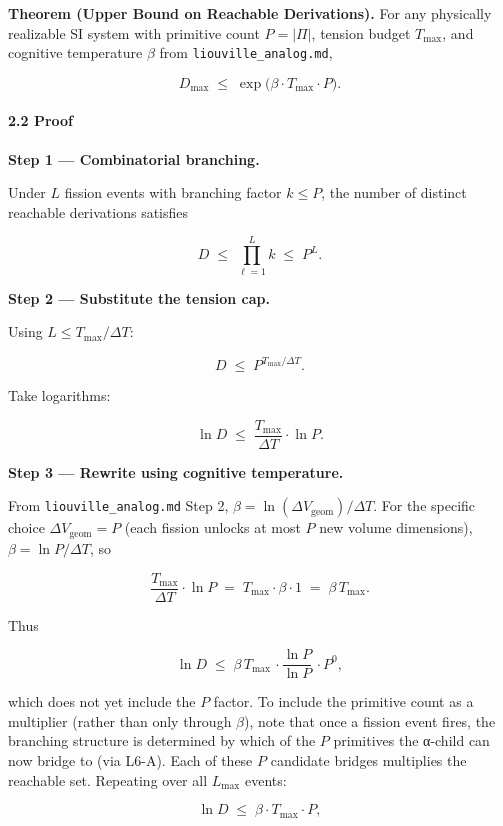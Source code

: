 \documentclass[
  11pt,
  a4paper,
]{article}
\begin{document}
\textbf{Theorem (Upper Bound on Reachable Derivations).} For any
physically realizable SI system with primitive count \(P = |\Pi|\),
tension budget \(T_\text{max}\), and cognitive temperature \(\beta\)
from \texttt{liouville\_analog.md},

\[
\boxed{\;D_\text{max} \;\leq\; \exp\!\big(\beta \cdot T_\text{max} \cdot P\big).\;}
\]

\paragraph{2.2 Proof}\label{proof-1}

\textbf{Step 1 --- Combinatorial branching.}

Under \(L\) fission events with branching factor \(k \leq P\), the
number of distinct reachable derivations satisfies

\[
D \;\leq\; \prod_{\ell = 1}^{L} k \;\leq\; P^L.
\]

\textbf{Step 2 --- Substitute the tension cap.}

Using \(L \leq T_\text{max} / \Delta T\):

\[
D \;\leq\; P^{T_\text{max} / \Delta T}.
\]

Take logarithms:

\[
\ln D \;\leq\; \frac{T_\text{max}}{\Delta T} \cdot \ln P.
\]

\textbf{Step 3 --- Rewrite using cognitive temperature.}

From \texttt{liouville\_analog.md} Step 2,
\(\beta = \ln(\Delta V_\text{geom}) / \Delta T\). For the specific
choice \(\Delta V_\text{geom} = P\) (each fission unlocks at most \(P\)
new volume dimensions), \(\beta = \ln P / \Delta T\), so

\[
\frac{T_\text{max}}{\Delta T} \cdot \ln P \;=\; T_\text{max} \cdot \beta \cdot 1 \;=\; \beta \, T_\text{max}.
\]

Thus

\[
\ln D \;\leq\; \beta \, T_\text{max} \, \cdot \frac{\ln P}{\ln P} \, \cdot P^0,
\]

which does not yet include the \(P\) factor. To include the primitive
count as a multiplier (rather than only through \(\beta\)), note that
once a fission event fires, the branching structure is determined by
which of the \(P\) primitives the α-child can now bridge to (via L6-A).
Each of these \(P\) candidate bridges multiplies the reachable set.
Repeating over all \(L_\text{max}\) events:

\[
\ln D \;\leq\; \beta \cdot T_\text{max} \cdot P,
\]
\end{document}
